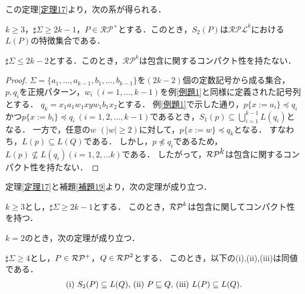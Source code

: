 この定理\ref{定理17}より，次の系が得られる．

\begin{col}\label{命題18}
$k \ge 3$，$\sharp\Sigma \ge 2k-1$，$P \in \mathcal{RP}^{+}$とする．このとき，$S_{2}(P)$は$\mathcal{RPL}^{k}$における$L(P)$の特徴集合である．
\end{col}

\begin{lem}\label{補題19}
$\sharp\Sigma \le 2k-2$とする．このとき，$\mathcal{RP}^{k}$は包含に関するコンパクト性を持たない．
\end{lem}

\begin{proof}
$\Sigma = \{ a_{1}, \ldots , a_{k-1}, b_{1}, \ldots , b_{k-1} \}$を$(2k-2)$個の定数記号から成る集合，$p, q_{i}$を正規パターン，$w_{i}~(i = 1, \ldots , k-1)$を例\ref{例題1}と同様に定義された記号列とする．
$q_{k} = x_{1}a_{1}w_{1}xyw_{1}b_{1}x_{2}$とする．
例\ref{例題1}で示した通り，$p \{ x := a_{i} \} \preceq q_{i}$かつ$p \{ x := b_{i} \} \preceq q_{i}~(i=1,2, \ldots ,k-1)$であるとき，$S_{1}(p) \subseteq \bigcup^{k-1}_{i=1} L(q_{i})$となる． 
一方で，任意の$w$ $(|w| \ge 2)$に対して，$p \{ x:= w \} \preceq q_{k}$となる． 
すなわち，$L(p) \subseteq L(Q)$である．
しかし，$p \not \preceq q_{i}$であるため，$L(p) \not \subseteq L(q_{i}) (i=1,2, \ldots k)$である．
したがって，$\mathcal{RP^{\mbox{$k$}}}$は包含に関するコンパクト性を持たない．
\end{proof}

定理\ref{定理17}と補題\ref{補題19}より，次の定理が成り立つ．

\begin{thm}
$k \ge 3$とし，$\sharp\Sigma \ge 2k-1$とする．
このとき，$\mathcal{RP}^{k}$は包含に関してコンパクト性を持つ．
\end{thm}

$k=2$のとき，次の定理が成り立つ．

\begin{thm}\label{補題21}
$\sharp \Sigma \ge 4$とし，$P \in \mathcal{RP^{+}}$，$Q \in \mathcal{RP}^{2}$とする．
このとき，以下の{\rm (i),(ii),(iii)}は同値である．
\[
\begin{tabular}{ll}
$(\mathrm{i})$ $S_{2}(P) \subseteq L(Q)$,
$(\mathrm{ii})$ $P \sqsubseteq Q$,
$(\mathrm{iii})$ $L(P) \subseteq L(Q)$.
\end{tabular}
\]
\end{thm}


